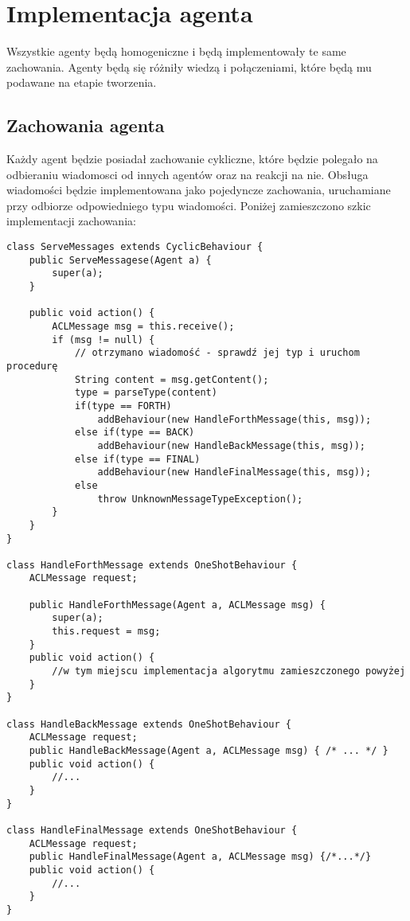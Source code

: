 \documentclass[a4paper,12pt]{mwart}
\begin{document}
\section{Implementacja agenta}
Wszystkie agenty będą homogeniczne i będą implementowały te same zachowania. Agenty będą się różniły wiedzą i połączeniami, które będą mu podawane na etapie tworzenia.
\subsection{Zachowania agenta}
Każdy agent będzie posiadał zachowanie cykliczne, które będzie polegało na odbieraniu wiadomosci od innych agentów oraz na reakcji na nie. Obsługa wiadomości będzie implementowana jako pojedyncze zachowania, uruchamiane przy odbiorze odpowiedniego typu wiadomości. Poniżej zamieszczono szkic implementacji zachowania:

\begin{verbatim}
class ServeMessages extends CyclicBehaviour {
    public ServeMessagese(Agent a) {
        super(a);
    }

    public void action() {
        ACLMessage msg = this.receive();
        if (msg != null) {
            // otrzymano wiadomość - sprawdź jej typ i uruchom procedurę
            String content = msg.getContent();
            type = parseType(content)
            if(type == FORTH)
                addBehaviour(new HandleForthMessage(this, msg));
            else if(type == BACK)
                addBehaviour(new HandleBackMessage(this, msg));
            else if(type == FINAL)
                addBehaviour(new HandleFinalMessage(this, msg));
            else
                throw UnknownMessageTypeException();
        }
    }
}

class HandleForthMessage extends OneShotBehaviour {
    ACLMessage request;

    public HandleForthMessage(Agent a, ACLMessage msg) {
        super(a);
        this.request = msg;
    }
    public void action() {
        //w tym miejscu implementacja algorytmu zamieszczonego powyżej
    }
}

class HandleBackMessage extends OneShotBehaviour {
    ACLMessage request;
    public HandleBackMessage(Agent a, ACLMessage msg) { /* ... */ }
    public void action() {
        //...
    }
}

class HandleFinalMessage extends OneShotBehaviour {
    ACLMessage request;
    public HandleFinalMessage(Agent a, ACLMessage msg) {/*...*/}
    public void action() {
        //...
    }
}

\end{verbatim}
\end{document}
